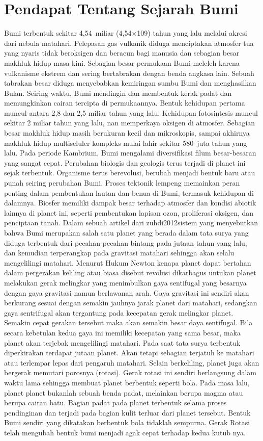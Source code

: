 \section{Pendapat Tentang Sejarah Bumi}
Bumi terbentuk sekitar 4,54 miliar (4,54×109) tahun yang lalu melalui akresi dari nebula matahari. Pelepasan gas vulkanik diduga menciptakan atmosfer tua yang nyaris tidak beroksigen dan beracun bagi manusia dan sebagian besar makhluk hidup masa kini. Sebagian besar permukaan Bumi meleleh karena vulkanisme ekstrem dan sering bertabrakan dengan benda angkasa lain. Sebuah tabrakan besar diduga menyebabkan kemiringan sumbu Bumi dan menghasilkan Bulan. Seiring waktu, Bumi mendingin dan membentuk kerak padat dan memungkinkan cairan tercipta di permukaannya. Bentuk kehidupan pertama muncul antara 2,8 dan 2,5 miliar tahun yang lalu. Kehidupan fotosintesis muncul sekitar 2 miliar tahun yang lalu, nan memperkaya oksigen di atmosfer. Sebagian besar makhluk hidup masih berukuran kecil dan mikroskopis, sampai akhirnya makhluk hidup multiseluler kompleks mulai lahir sekitar 580 juta tahun yang lalu. Pada periode Kambrium, Bumi mengalami diversifikasi filum besar-besaran yang sangat cepat. Perubahan biologis dan geologis terus terjadi di planet ini sejak terbentuk. Organisme terus berevolusi, berubah menjadi bentuk baru atau punah seiring perubahan Bumi. Proses tektonik lempeng memainkan peran penting dalam pembentukan lautan dan benua di Bumi, termasuk kehidupan di dalamnya. Biosfer memiliki dampak besar terhadap atmosfer dan kondisi abiotik lainnya di planet ini, seperti pembentukan lapisan ozon, proliferasi oksigen, dan penciptaan tanah. Dalam sebuah artikel dari zuhdi2012sistem yang menyebutkan bahwa Bumi merupakan salah satu planet yang berada dalam tata surya yang diduga terbentuk dari pecahan-pecahan bintang pada jutaan tahun yang lalu, dan kemudian terperangkap pada gravitasi matahari sehingga akan selalu mengelilingi matahari. Menurut Hukum Newton kenapa planet dapat bertahan dalam pergerakan keliling atau biasa disebut revolusi dikarbagus untukan planet melakukan gerak melingkar yang menimbulkan gaya sentifugal yang besarnya  dengan gaya gravitasi namun berlawanan arah. Gaya gravitasi ini sendiri akan berkurang sesuai dengan semakin jauhnya jarak planet dari matahari, sedangkan gaya sentrifugal  akan tergantung pada kecepatan gerak melingkar planet. Semakin cepat gerakan tersebut maka akan semakin besar daya sentifugal. Bila secara kebetulan kedua gaya ini memiliki kecepatan yang sama besar, maka planet akan terjebak mengelilingi matahari. Pada saat tata surya terbentuk diperkirakan terdapat jutaan planet. Akan tetapi sebagian terjatuh ke matahari atau terlempar lepas dari pengaruh matahari. Selain berkeliling, planet juga akan bergerak memutari porosnya (rotasi). Gerak rotasi ini sendiri berlangsung dalam waktu lama sehingga membuat planet berbentuk seperti bola. Pada masa lalu, planet planet bukanlah sebuah benda padat, melainkan berupa magma atau berupa cairan batu. Bagian padat pada planet terbentuk selama proses pendinginan dan terjadi pada bagian kulit terluar dari planet tersebut. Bentuk Bumi sendiri yang dikatakan berbentuk bola tidaklah sempurna. Gerak Rotasi telah mengubah bentuk bumi menjadi agak cepat terhadap kedua kutub nya.\cite{zuhdi2012sistem}




